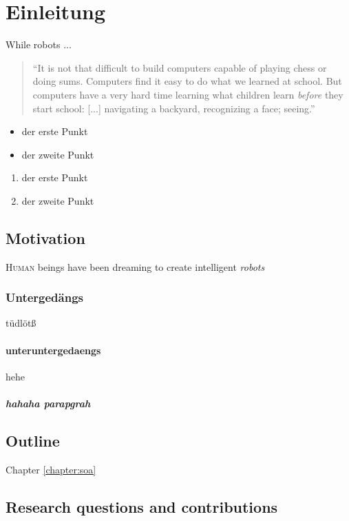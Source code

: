 \chapter{Einleitung}
\ifpdf
    \graphicspath{{1_introduction/figures/PNG/}{1_einleitung/figures/PDF/}{1_einleitung/figures/}}
\else
    \graphicspath{{1_einleitung/figures/EPS/}{1_einleitung/figures/}}
\fi



While robots ...

\begin{quote}
``It is not that difficult to build computers capable of playing chess or doing sums. Computers find it easy to do what we learned at school. But computers have a very hard time learning what children learn \textit{before} they start school: [...] navigating a backyard, recognizing a face; seeing.'' 
\end{quote}

\begin{itemize}
\item der erste Punkt
\item der zweite Punkt
\end{itemize}

\begin{enumerate}
\item der erste Punkt
\item der zweite Punkt
\end{enumerate}

\section{Motivation} %
\lettrine{H}{uman} beings have been dreaming to create intelligent \emph{robots} 

\subsection{Untergedängs}
tüdlötß
\subsubsection{unteruntergedaengs}
hehe

\paragraph{hahaha parapgrah}

\section{Outline}

Chapter \ref{chapter:soa} 

\section{Research questions and contributions}
\label{sec:introduction:contributions}

\newpage\thispagestyle{empty}